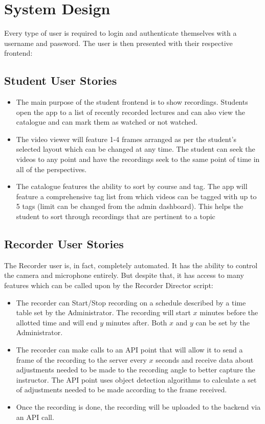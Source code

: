 \documentclass[12pt, conference]{IEEEtran}
\begin{document}
\section{System Design}
Every type of user is required to login and authenticate themselves with a username and password. The user is then presented with their respective frontend:
\subsection{Student User Stories}
\begin{itemize}
    \item{The main purpose of the student frontend is to show recordings. Students open the app to a list of recently recorded lectures and can also view the catalogue and can mark them as watched or not watched.}
    \item{The video viewer will feature 1-4 frames arranged as per the student's selected layout which can be changed at any time. The student can seek the videos to any point and have the recordings seek to the same point of time in all of the perspectives.}
    \item{The catalogue features the ability to sort by course and tag. The app will feature a comprehensive tag list from which videos can be tagged with up to 5 tags (limit can be changed from the admin dashboard). This helps the student to sort through recordings that are pertinent to a topic}
\end{itemize}
\subsection{Recorder User Stories}
The Recorder user is, in fact, completely automated. It has the ability to control the camera and microphone entirely. But despite that, it has access to many features which can be called upon by the Recorder Director script:
\begin{itemize}
    \item{The recorder can Start/Stop recording on a schedule described by a time table set by the Administrator. The recording will start $x$ minutes before the allotted time and will end $y$ minutes after. Both $x$ and $y$ can be set by the Administrator.}
    \item{The recorder can make calls to an API point that will allow it to send a frame of the recording to the server every $x$ seconds and receive data about adjustments needed to be made to the recording angle to better capture the instructor. The API point uses object detection algorithms to calculate a set of adjustments needed to be made according to the frame received.}
    \item{Once the recording is done, the recording will be uploaded to the backend via an API call.}
\end{itemize}
\end{document}
